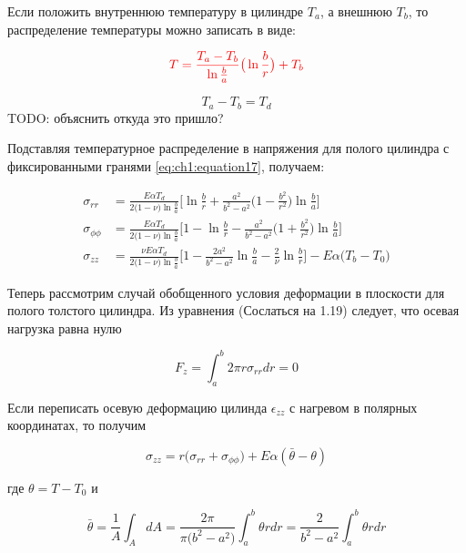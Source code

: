 Если положить внутреннюю температуру в цилиндре \(T_a\), а внешнюю \(T_b\), то распределение температуры можно записать в виде:

\begin{equation}
	\label{eq:ch1:equation20}
	{\color{red}T=\frac{T_a - T_b}{\ln{\frac{b}{a}}} \big(\ln{\frac{b}{r}} \big) + T_b}
\end{equation}

\[T_a - T_b = T_d\]
{\color{red}TODO: объяснить откуда это пришло?}

Подставляя температурное распределение в напряжения для полого цилиндра с фиксированными гранями \cref{eq:ch1:equation17}, получаем:

\begin{equation}
	\label{eq:ch1:equation21}
	\begin{split}
		\sigma_{rr} &= \frac{E \alpha T_d}{2 \big (1 -\nu \big) \ln{\frac{b}{a}}}\big[ \ln{\frac{b}{r}} + \frac{a^2}{b^2-a^2} \big(1-\frac{b^2}{r^2} \big) \ln{\frac{b}{a}}\big]\\
		\sigma_{\phi\phi} &= \frac{E \alpha T_d}{2 \big (1-\nu \big ) \ln{\frac{b}{a}} }\big[1 - \ln{\frac{b}{r}} - \frac{a^2}{b^2-a^2}\big(1+\frac{b^2}{r^2} \big)\ln{\frac{b}{a}} \big] \\
		\sigma_{zz} &= \frac{\nu E \alpha T_d}{2 \big (1-\nu \big) \ln{\frac{b}{a}}} \big [1-\frac{2 a^2}{b^2 - a^2}\ln{\frac{b}{a}}-\frac{2}{\nu} \ln{\frac{b}{r}} \big] - E \alpha \big(T_b - T_0 \big)
	\end{split}
\end{equation}

Теперь рассмотрим случай обобщенного условия деформации в плоскости для полого толстого цилиндра. Из уравнения ({\color{red}Сослаться на 1.19}) следует, что осевая нагрузка равна нулю

\begin{equation}
	\label{eq:ch1:equation22}
	F_z = \int_a^b 2 \pi r \sigma_{rr} dr = 0
\end{equation}

Если переписать осевую деформацию цилинда \(\epsilon_{zz}\) с нагревом в полярных координатах, то получим

\begin{equation}
	\label{eq:ch1:equation23}
	\sigma_{zz} = r \big (\sigma_{rr}+\sigma_{\phi\phi} \big) + E \alpha (\bar{\theta} - \theta)
\end{equation}

где \(\theta = T - T_0\) и

\begin{equation}
	\label{eq:ch1:equation24}
	\bar{\theta} = \frac{1}{A} \int_A dA = \frac{2 \pi}{\pi \big (b^2 - a^2 \big)} \int_a^b \theta rdr = \frac{2}{b^2-a^2} \int_a^b \theta rdr
\end{equation}


